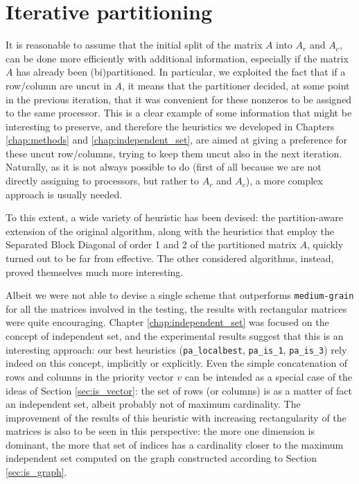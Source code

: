 \section{Iterative partitioning} \label{sec:conclusions_pa}

It is reasonable to assume that the initial split of the matrix $A$ into $A_r$ and $A_c$, can be done more efficiently with additional information, especially if the matrix $A$ has already been (bi)partitioned. In particular, we exploited the fact that if a row/column are uncut in $A$, it means that the partitioner decided, at some point in the previous iteration, that it was convenient for these nonzeros to be assigned to the same processor. This is a clear example of some information that might be interesting to preserve, and therefore the heuristics we developed in Chapters \ref{chap:methods} and \ref{chap:independent_set}, are aimed at giving a preference for these uncut row/columns, trying to keep them uncut also in the next iteration. Naturally, as it is not always possible to do (first of all because we are not directly assigning to processors, but rather to $A_r$ and $A_c$), a more complex approach is usually needed.

To this extent, a wide variety of heuristic has been devised: the partition-aware extension of the original algorithm, along with the heuristics that employ the Separated Block Diagonal of order 1 and 2 of the partitioned matrix $A$, quickly turned out to be far from effective. The other considered algorithms, instead, proved themselves much more interesting.

Albeit we were not able to devise a single scheme that outperforms \verb|medium-grain| for all the matrices involved in the testing, the results with rectangular matrices were quite encouraging. Chapter \ref{chap:independent_set} was focused on the concept of independent set, and the experimental results suggest that this is an interesting approach: our best heuristics (\verb|pa_localbest|, \verb|pa_is_1|, \verb|pa_is_3|) rely indeed on this concept, implicitly or explicitly. Even the simple concatenation of rows and columns in the priority vector $v$ can be intended as a special case of the ideas of Section \ref{sec:is_vector}: the set of rows (or columns) is as a matter of fact an independent set, albeit probably not of maximum cardinality. The improvement of the results of this heuristic with increasing rectangularity of the matrices is also to be seen in this perspective: the more one dimension is dominant, the more that set of indices has a cardinality closer to the maximum independent set computed on the graph constructed according to Section \ref{sec:is_graph}.

